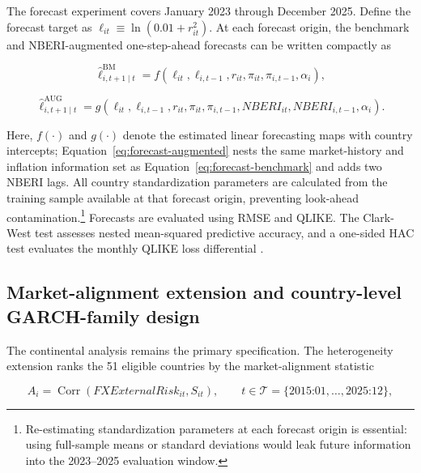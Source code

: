 \documentclass[11pt]{article}
\begin{document}
The forecast experiment covers January 2023 through December 2025. Define the forecast target as $\ell_{it}\equiv\ln(0.01+r_{it}^{2})$. At each forecast origin, the benchmark and NBERI-augmented one-step-ahead forecasts can be written compactly as

\begin{equation}
\label{eq:forecast-benchmark}
\widehat{\ell}^{\mathrm{BM}}_{i,t+1\mid t}
=f\!\left(\ell_{it},\ell_{i,t-1},r_{it},\pi_{it},\pi_{i,t-1},\alpha_i\right),
\end{equation}

\begin{equation}
\label{eq:forecast-augmented}
\widehat{\ell}^{\mathrm{AUG}}_{i,t+1\mid t}
=g\!\left(\ell_{it},\ell_{i,t-1},r_{it},\pi_{it},\pi_{i,t-1},
NBERI_{it},NBERI_{i,t-1},\alpha_i\right).
\end{equation}

Here, $f(\cdot)$ and $g(\cdot)$ denote the estimated linear forecasting maps with country intercepts; Equation~\eqref{eq:forecast-augmented} nests the same market-history and inflation information set as Equation~\eqref{eq:forecast-benchmark} and adds two NBERI lags. All country standardization parameters are calculated from the training sample available at that forecast origin, preventing look-ahead contamination.\footnote{Re-estimating standardization parameters at each forecast origin is essential: using full-sample means or standard deviations would leak future information into the 2023--2025 evaluation window.} Forecasts are evaluated using RMSE and QLIKE. The Clark-West test assesses nested mean-squared predictive accuracy, and a one-sided HAC test evaluates the monthly QLIKE loss differential \citep{clark2007,patton2011}.

\subsection{Market-alignment extension and country-level
GARCH-family
design}\label{market-alignment-extension-and-country-level-garch-family-design}

The continental analysis remains the primary specification. The heterogeneity extension ranks the 51 eligible countries by the market-alignment statistic

\begin{equation}
\label{eq:alignment}
A_i
=\operatorname{Corr}\!\left(FXExternalRisk_{it},S_{it}\right),
\qquad
t\in\mathcal{T}=\{\text{2015:01},\ldots,\text{2025:12}\},
\end{equation}
\end{document}
